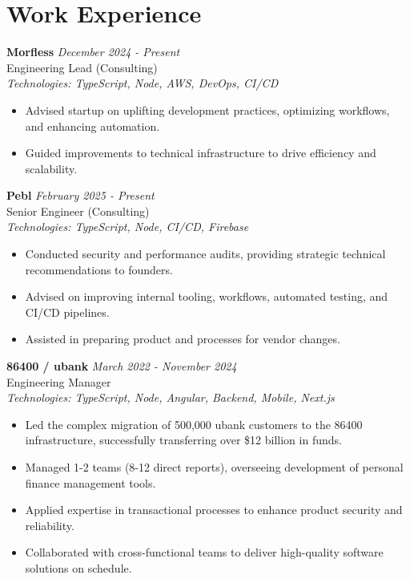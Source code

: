 \documentclass[a4paper,10pt]{article}
\begin{document}
\section*{Work Experience}

\textbf{Morfless} \hfill \textit{December 2024 - Present} \\
Engineering Lead (Consulting) \\
\textit{Technologies: TypeScript, Node, AWS, DevOps, CI/CD}
\begin{itemize}
    \item Advised startup on uplifting development practices, optimizing workflows, and enhancing automation.
    \item Guided improvements to technical infrastructure to drive efficiency and scalability.
\end{itemize}

\vspace{1em}

\textbf{Pebl} \hfill \textit{February 2025 - Present} \\
Senior Engineer (Consulting) \\
\textit{Technologies: TypeScript, Node, CI/CD, Firebase}
\begin{itemize}
    \item Conducted security and performance audits, providing strategic technical recommendations to founders.
    \item Advised on improving internal tooling, workflows, automated testing, and CI/CD pipelines.
    \item Assisted in preparing product and processes for vendor changes.
\end{itemize}

\vspace{1em}

\textbf{86400 / ubank} \hfill \textit{March 2022 - November 2024} \\
Engineering Manager \\
\textit{Technologies: TypeScript, Node, Angular, Backend, Mobile, Next.js}
\begin{itemize}
    \item Led the complex migration of 500,000 ubank customers to the 86400 infrastructure, successfully transferring over \$12 billion in funds.
    \item Managed 1-2 teams (8-12 direct reports), overseeing development of personal finance management tools.
    \item Applied expertise in transactional processes to enhance product security and reliability.
    \item Collaborated with cross-functional teams to deliver high-quality software solutions on schedule.
\end{itemize}
\end{document}
